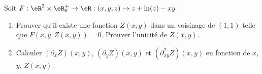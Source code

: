 
\begin{exercice}\label{exoImplicite0001}

Soit $F: \eR^2 \times \eR_0^+  \rightarrow  \eR : (x,y,z) \mapsto  z +
\ln(z) - xy$
\begin{enumerate}
\item
Prouver qu'il existe une fonction $Z(x,y)$ dans un voisinage de $(1,1)$
telle que $F(x,y,Z(x,y))=0$. Prouver l'unicité de $Z(x,y)$.
\item
Calculer $(\partial_x Z)(x,y)$, $(\partial_y Z)(x,y)$ et $(\partial^2_{xy}
Z)(x,y)$ en fonction de $x$, $y $, $Z(x,y)$.
\end{enumerate}

\end{exercice}
